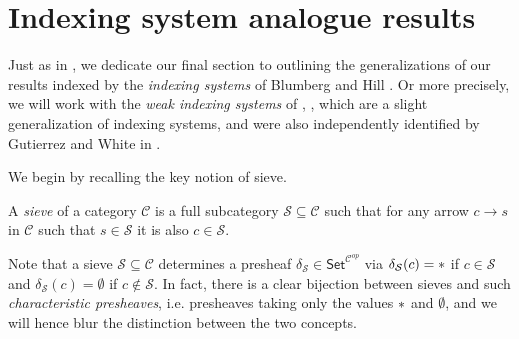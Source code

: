 \documentclass[a4paper,10pt
,draft
]{article}%
\begin{document}




\section{Indexing system analogue results}\label{INDEX SEC}


Just as in \cite[\S 9]{Per18}, we dedicate our final section
to outlining the generalizations of our results indexed by the 
\textit{indexing systems} of Blumberg and Hill \cite{BH15}.
Or more precisely, we will work with the \textit{weak indexing systems}
of \cite[\S 9]{Per18}, \cite[\S 4.4]{BP17},
which are a slight generalization of indexing systems, 
and were also independently identified by Gutierrez and White in \cite{GW17}.

We begin by recalling the key notion of sieve.

\begin{definition}
A \textit{sieve} of a category $\mathcal{C}$
is a full subcategory $\mathcal{S} \subseteq \mathcal{C}$ such that for any arrow $c \to s$ in $\mathcal{C}$ such that $s \in \mathcal{S}$ it is also $c \in \mathcal{S}$.
\end{definition}

Note that a sieve $\mathcal{S} \subseteq \mathcal{C}$
determines a presheaf 
$\delta_{\mathcal{S}} \in \mathsf{Set}^{\mathcal{C}^{op}}$ 
via 
$\delta_{\mathcal{S}}(c) = \**$ if $c \in \mathcal{S}$ and
$\delta_{\mathcal{S}}(c) = \emptyset$ if $c \not \in \mathcal{S}$.
In fact, there is a clear bijection between sieves and such 
\textit{characteristic presheaves}, i.e. presheaves taking only the values $\**$ and $\emptyset$, 
and we will hence blur the distinction between the two concepts.
\end{document}
